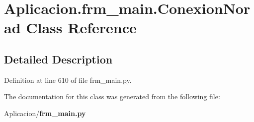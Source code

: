 \section{\-Aplicacion.\-frm\-\_\-main.\-Conexion\-Norad \-Class \-Reference}
\label{class_aplicacion_1_1frm__main_1_1_conexion_norad}


\subsection{\-Detailed \-Description}


\-Definition at line 610 of file frm\-\_\-main.\-py.



\-The documentation for this class was generated from the following file\-:\begin{DoxyCompactItemize}
\item 
\-Aplicacion/{\bf frm\-\_\-main.\-py}\end{DoxyCompactItemize}
